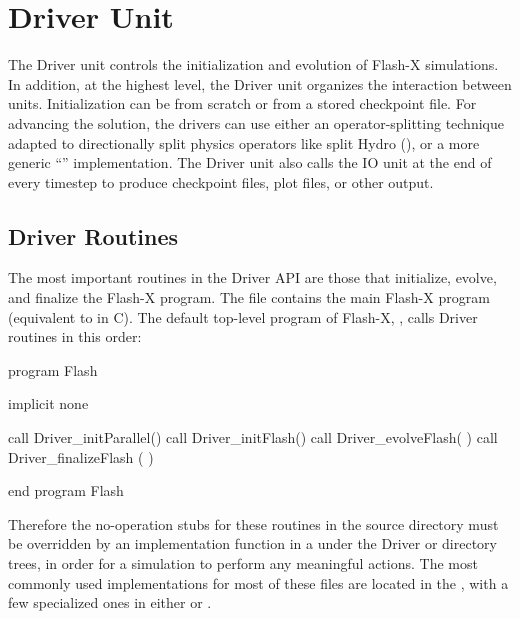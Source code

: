 \chapter{Driver Unit}
\label{Chp:Driver Unit}

The \unit{Driver} unit controls the initialization and evolution of Flash-X simulations.
In addition, at the highest level, the \unit{Driver} unit organizes the interaction between units. Initialization can be from scratch or
from a stored checkpoint file. For advancing the solution, the drivers
can use either an operator-splitting technique adapted to directionally 
split physics operators like split \unit{Hydro}  (), or a
more generic ``'' implementation.
The \unit{Driver} unit also calls the
\unit{IO} unit at the end of every timestep to produce checkpoint
files, plot files, or other output.

\section{Driver Routines} \label{Driver Routines}
The most important routines in the \unit{Driver} API are those that initialize,
evolve, and finalize the Flash-X program.
The file
contains the main Flash-X program (equivalent to  in C).
The default top-level program of Flash-X,
, calls \unit{Driver} routines in this order:

\begin{codeseg}
program Flash

  implicit none
  
  call Driver_initParallel()
  call Driver_initFlash()
  call Driver_evolveFlash( )
  call Driver_finalizeFlash ( )

end program Flash
\end{codeseg}


Therefore the no-operation stubs for these routines in the  source directory
must be overridden by an implementation function in a \uid under the \unit{Driver}
or  directory trees,
in order for
a simulation to perform any meaningful actions.
The most commonly used implementations
for most of these files are located in the
 \uid, with
a few specialized ones in either
 or
.



